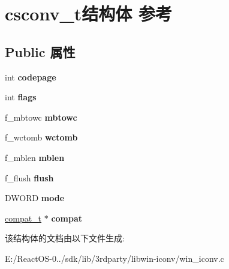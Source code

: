 \hypertarget{structcsconv__t}{}\section{csconv\+\_\+t结构体 参考}
\label{structcsconv__t}
\subsection*{Public 属性}
\begin{DoxyCompactItemize}
\item 
\mbox{\label{structcsconv__t_af860d717ec46197715f7e4832d16dea0}} 
int {\bfseries codepage}
\item 
\mbox{\label{structcsconv__t_a346503dc1864dac0d0581454d0a6f67b}} 
int {\bfseries flags}
\item 
\mbox{\label{structcsconv__t_ad6acb90b62c51d399599a8fa6d581974}} 
f\+\_\+mbtowc {\bfseries mbtowc}
\item 
\mbox{\label{structcsconv__t_aa69767b4479a1a2ad7fad454cd361102}} 
f\+\_\+wctomb {\bfseries wctomb}
\item 
\mbox{\label{structcsconv__t_a8844be5c8aa777ba156050bb065448f3}} 
f\+\_\+mblen {\bfseries mblen}
\item 
\mbox{\label{structcsconv__t_ae20473b9862c6020fabf14f92d1b7051}} 
f\+\_\+flush {\bfseries flush}
\item 
\mbox{\label{structcsconv__t_a21a21669edd1944bca0342e33bc7e201}} 
D\+W\+O\+RD {\bfseries mode}
\item 
\mbox{\label{structcsconv__t_ab0e996dbf4b849bad60b770d2fe2f7e4}} 
\hyperlink{structcompat__t}{compat\+\_\+t} $\ast$ {\bfseries compat}
\end{DoxyCompactItemize}


该结构体的文档由以下文件生成\+:\begin{DoxyCompactItemize}
\item 
E\+:/\+React\+O\+S-\/0../sdk/lib/3rdparty/libwin-\/iconv/win\+\_\+iconv.\+c\end{DoxyCompactItemize}
